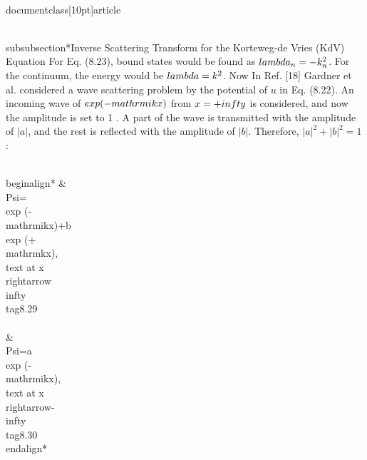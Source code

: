 \\documentclass[10pt]{article}
\begin{document}
{{{{{\\subsubsection*{Inverse Scattering Transform for the Korteweg-de Vries (KdV) Equation}
For Eq. (8.23), bound states would be found as $\\lambda_{n}=-k_{n}^{2}$. For the continuum, the energy would be $\\lambda=k^{2}$. Now In Ref. [18] Gardner et al. considered a wave scattering problem by the potential of $u$ in Eq. (8.22). An incoming wave of $\\exp (-\\mathrm{ikx})$ from $x=+\\infty$ is considered, and now the amplitude is set to 1 . A part of the wave is transmitted with the amplitude of $|a|$, and the rest is reflected with the amplitude of $|b|$. Therefore, $|a|^{2}+|b|^{2}=1$ :


\\begin{align*}
& \\Psi=\\exp (-\\mathrm{ikx})+b \\exp (+\\mathrm{kx}), \\text { at } x \\rightarrow \\infty  \\tag{8.29}\\\\
& \\Psi=a \\exp (-\\mathrm{ikx}), \\text { at } x \\rightarrow-\\infty \\tag{8.30}
\\end{align*}


}}}}}
\end{document}
